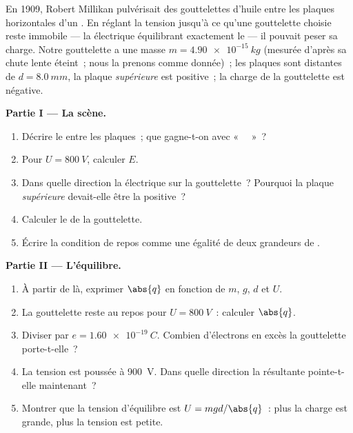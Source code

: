 \begin{problem}
\label{pb:g11:electric-gravitational-fields:1}
En 1909, Robert Millikan pulvérisait des gouttelettes d'huile entre les
plaques horizontales d'un
. En réglant la
tension jusqu'à ce qu'une gouttelette
choisie reste immobile --- la  électrique
équilibrant exactement le
 --- il pouvait peser sa charge.
Notre gouttelette a une masse $m = \qty{4.90e-15}{kg}$ (mesurée d'après
sa chute lente  éteint~; nous la prenons comme donnée)~; les
plaques sont distantes de $d = \qty{8.0}{mm}$, la plaque
\emph{supérieure} est positive~; la charge de la gouttelette est
négative.

\medskip
\noindent\textbf{Partie I --- La scène.}
\begin{enumerate}
  \item Décrire le  entre les
        plaques~; que gagne-t-on avec «~
        ~»~?
  \item Pour $U = \qty{800}{V}$, calculer $E$.
  \item Dans quelle direction la  électrique
        sur la gouttelette~? Pourquoi la plaque \emph{supérieure} devait-elle
        être la positive~?
  \item Calculer le  de la
        gouttelette.
  \item Écrire la condition de repos comme une égalité de deux grandeurs
        de .
\end{enumerate}

\medskip
\noindent\textbf{Partie II --- L'équilibre.}
\begin{enumerate}[resume]
  \item À partir de là, exprimer $\abs{q}$ en fonction de $m$, $g$, $d$
        et $U$.
  \item La gouttelette reste au repos pour $U = \qty{800}{V}$~: calculer
        $\abs{q}$.
  \item Diviser par $e = \qty{1.60e-19}{C}$. Combien d'électrons en
        excès la gouttelette porte-t-elle~?
  \item La tension est poussée à
        \qty{900}{V}. Dans quelle direction la
         résultante pointe-t-elle
        maintenant~?
  \item Montrer que la tension
        d'équilibre est $U = mgd/\abs{q}$~: plus la charge est grande,
        plus la tension est petite.
\end{enumerate}


\end{problem}

